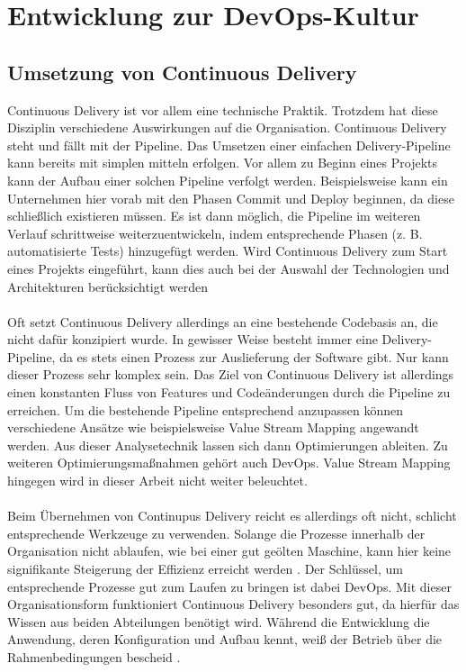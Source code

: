 \section{Entwicklung zur DevOps-Kultur} \label{entwicklung}

\subsection{Umsetzung von Continuous Delivery}
Continuous Delivery ist vor allem eine technische Praktik. Trotzdem hat diese Disziplin verschiedene Auswirkungen auf die Organisation. Continuous Delivery steht und fällt mit der Pipeline. Das Umsetzen einer einfachen Delivery-Pipeline kann bereits mit simplen mitteln erfolgen. Vor allem zu Beginn eines Projekts kann der Aufbau einer solchen Pipeline verfolgt werden. Beispielsweise kann ein Unternehmen hier vorab mit den Phasen Commit und Deploy beginnen, da diese schließlich existieren müssen. Es ist dann möglich, die Pipeline im weiteren Verlauf schrittweise weiterzuentwickeln, indem entsprechende Phasen (z. B. automatisierte Tests) hinzugefügt werden. Wird Continuous Delivery zum Start eines Projekts eingeführt, kann dies auch bei der Auswahl der Technologien und Architekturen berücksichtigt werden \cite{Wolff.2016} \\ \\
Oft setzt Continuous Delivery allerdings an eine bestehende Codebasis an, die nicht dafür konzipiert wurde. In gewisser Weise besteht immer eine Delivery-Pipeline, da es stets einen Prozess zur Auslieferung der Software gibt. Nur kann dieser Prozess sehr komplex sein. Das Ziel von Continuous Delivery ist allerdings einen konstanten Fluss von Features und Codeänderungen durch die Pipeline zu erreichen. Um die bestehende Pipeline entsprechend anzupassen können verschiedene Ansätze wie beispielsweise Value Stream Mapping angewandt werden. Aus dieser Analysetechnik lassen sich dann Optimierungen ableiten. Zu weiteren Optimierungsmaßnahmen gehört auch DevOps. Value Stream Mapping hingegen wird in dieser Arbeit nicht weiter beleuchtet. \\ \\
Beim Übernehmen von Continupus Delivery reicht es allerdings oft nicht, schlicht entsprechende Werkzeuge zu verwenden. Solange die Prozesse innerhalb der Organisation nicht ablaufen, wie bei einer gut geölten Maschine, kann hier keine signifikante Steigerung der Effizienz erreicht werden \cite{Virmani.2015}. Der Schlüssel, um entsprechende Prozesse gut zum Laufen zu bringen ist dabei DevOps. Mit dieser Organisationsform funktioniert Continuous Delivery besonders gut, da hierfür das Wissen aus beiden Abteilungen benötigt wird. Während die Entwicklung die Anwendung, deren Konfiguration und Aufbau kennt, weiß der Betrieb über die Rahmenbedingungen bescheid \cite{Wolff.2016}.

